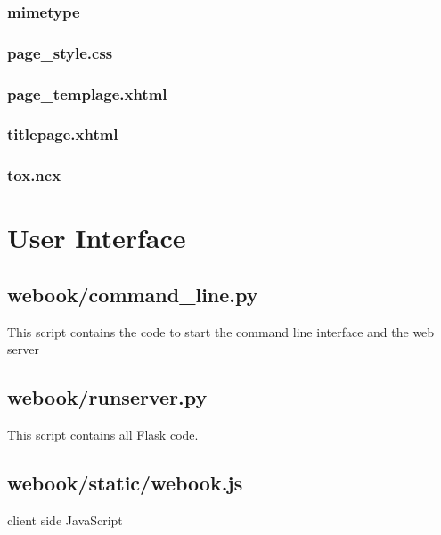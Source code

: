 \documentclass[]{report}   %
\begin{document}
\begin{appendices}
        \subsection{mimetype}
        

        \subsection{page\_style.css}
        

        \subsection{page\_templage.xhtml}
        

        \subsection{titlepage.xhtml}
        

        \subsection{tox.ncx}
        

\chapter{User Interface}
    \section{webook/command\_line.py}
    This script contains the code to start the command line interface and the web server

    \section{webook/runserver.py}
    This script contains all Flask code.

    \section{webook/static/webook.js}
    client side JavaScript
    


\end{appendices}
\end{document}

